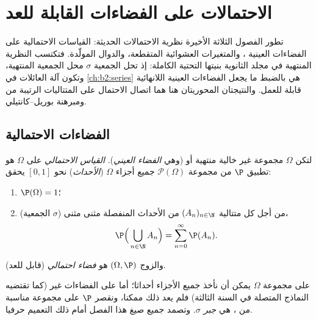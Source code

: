 \chapter{الاحتمالات على الفضاءات القابلة للعد}\label{ch:b2:proba}

تطور الفصول الثلاثة الأخيرة نظرية الاحتمالات الحديثة: القياسات
الاحتمالية على الفضاءات العينية ، والمتغيرات العشوائية
المتقطعة، والدوال المولّدة. فتكتسب النظرية المنتهية في مجلد الثانوية
بنيتها التحتية الكاملة: إذ تحل الجمعية $\sigma$ محل الجمعية المنتهية،
وتكون آلة العائلات  في \cref{ch:b2:series} هي بالضبط ما يجعل الفضاءات
العينية اللانهائية قابلة للعمل. والنتيجتان المحوريتان هنا هما اتصال
الاحتمال على المتتاليات الرتيبة من  ومبرهنة بوريل--كانتيلي.

\section{الفضاءات الاحتمالية}

\begin{definition}\label{def:b2:proba:space}
لتكن $\Omega$ مجموعة غير خالية منتهية أو  (وهي \emph{الفضاء
العيني}). \emph{القياس الاحتمالي}
على $\Omega$ هو تطبيق $\P$ من مجموعة $\mathcal{P}(\Omega)$ جميع أجزاء $\Omega$
(\emph{الأحداث}) نحو $[0, 1]$ يحقق:
\begin{enumerate}
\item $\P(\Omega) = 1$؛
\item (الجمعية $\sigma$) من أجل كل متتالية $(A_n)_{n\in\N}$ من الأحداث المنفصلة
مثنى مثنى،
\[
\P\Bigl(\,\bigcup_{n \in \N} A_n\Bigr)
= \sum_{n=0}^{\infty} \P(A_n) .
\]
\end{enumerate}
والزوج $(\Omega, \P)$ هو \emph{فضاء احتمالي} (قابل للعد).
\end{definition}

\begin{remark}
على مجموعة $\Omega$  يمكن أن نأخذ جميع الأجزاء أحداثا؛ أما
على الفضاءات غير  (كما تقتضيه النماذج المتصلة في السنة
الثالثة) فلم يعد ذلك ممكنا، ونقصر $\P$ على مجموعة مناسبة من
، هي \emph{جبر $\sigma$}. وتصمد جميع صيغ هذا الفصل أمام ذلك
التعميم حرفيا.
\end{remark}

